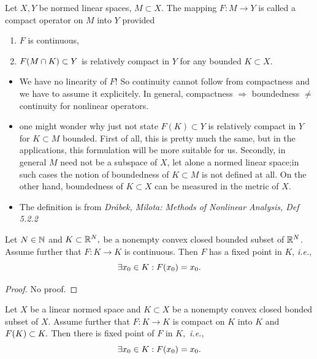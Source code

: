 \documentclass{article}
\begin{document}
\begin{definition}
	Let $X,Y$ be normed linear spaces, $M \subset X.$ The mapping $F:M \to Y$ is called a compact operator on $M$ into $Y$ provided
	\begin{enumerate}
		\item $F$ is continuous,
		\item $F\qty(M \cap K) \subset Y$ is relatively compact in $Y$ for any bounded $K \subset X.$
	\end{enumerate}
\end{definition}

\begin{remark}

	\begin{itemize}
		\item	We have no linearity of $F$! So continuity cannot follow from compactness and we have to assume it explicitely. In general, compactness $\Rightarrow $ boundedness $\neq$ continuity for nonlinear operators.
		\item one might wonder why just not state $F(K) \subset Y$ is relatively compact in $Y$ for $K \subset M $ bounded. First of all, this is pretty much the same, but in the applications, this formulation will be more suitable for us. Secondly, in general $M$ need not be a subspace of $X$, let alone a normed linear space;in such cases the notion of boundedness of $K \subset M$ is not defined at all. On the other hand, boundedness of $K \subset X$ can be measured in the metric of $X.$
		\item	The definition is from \textit{Drábek, Milota: Methods of Nonlinear Analysis, Def 5.2.2}
	\end{itemize}
\end{remark}

\begin{theorem}
	Let $N \in {\mathbb N}$ and $K \subset {\mathbb R}^N,$ be a nonempty convex closed bounded subset of ${\mathbb R}^{N}$. Assume further that $F: K \to K$ is continuous. Then $F$ has a fixed point in $K$, \textit{i.e.},
	\[
		\exists x_0 \in K: F\qty(x_{0}) = x_0.
	\]
\end{theorem}

\begin{proof}
	No proof.
\end{proof}

\begin{theorem}
	Let $X$ be a linear normed space and $K \subset X$ be a nonempty convex closed bonded subset of $X$. Assume further that $F: K \to K$ is compact on $K$ into $K$ and $F\qty(K) \subset K.$ Then there is fixed point of $F$ in $K,$ \textit{i.e.},
	\[
		\exists x_0 \in K: F\qty(x_0) = x_0.
	\]
\end{theorem}
\end{document}
